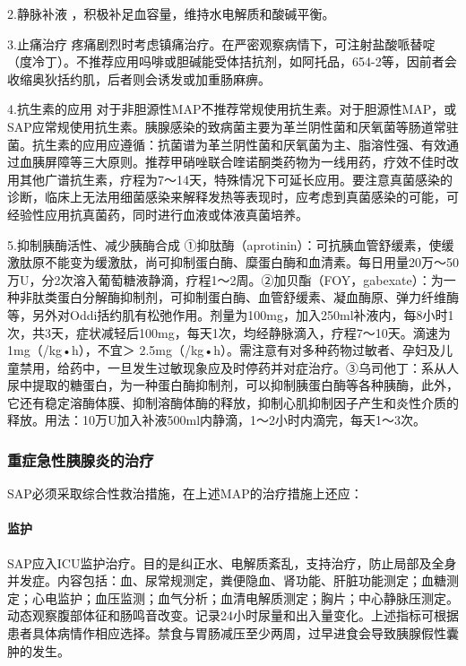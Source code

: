 2.静脉补液 ，积极补足血容量，维持水电解质和酸碱平衡。

3.止痛治疗
疼痛剧烈时考虑镇痛治疗。在严密观察病情下，可注射盐酸哌替啶（度冷丁）。不推荐应用吗啡或胆碱能受体拮抗剂，如阿托品，654-2等，因前者会收缩奥狄括约肌，后者则会诱发或加重肠麻痹。

4.抗生素的应用
对于非胆源性MAP不推荐常规使用抗生素。对于胆源性MAP，或SAP应常规使用抗生素。胰腺感染的致病菌主要为革兰阴性菌和厌氧菌等肠道常驻菌。抗生素的应用应遵循：抗菌谱为革兰阴性菌和厌氧菌为主、脂溶性强、有效通过血胰屏障等三大原则。推荐甲硝唑联合喹诺酮类药物为一线用药，疗效不佳时改用其他广谱抗生素，疗程为7～14天，特殊情况下可延长应用。要注意真菌感染的诊断，临床上无法用细菌感染来解释发热等表现时，应考虑到真菌感染的可能，可经验性应用抗真菌药，同时进行血液或体液真菌培养。

5.抑制胰酶活性、减少胰酶合成
①抑肽酶（aprotinin）：可抗胰血管舒缓素，使缓激肽原不能变为缓激肽，尚可抑制蛋白酶、糜蛋白酶和血清素。每日用量20万～50万U，分2次溶入葡萄糖液静滴，疗程1～2周。②加贝酯（FOY，gabexate）：为一种非肽类蛋白分解酶抑制剂，可抑制蛋白酶、血管舒缓素、凝血酶原、弹力纤维酶等，另外对Oddi括约肌有松弛作用。剂量为100mg，加入250ml补液内，每8小时1次，共3天，症状减轻后100mg，每天1次，均经静脉滴入，疗程7～10天。滴速为1mg（/kg•h），不宜＞
2.5mg（/kg•h）。需注意有对多种药物过敏者、孕妇及儿童禁用，给药中，一旦发生过敏现象应及时停药并对症治疗。③乌司他丁：系从人尿中提取的糖蛋白，为一种蛋白酶抑制剂，可以抑制胰蛋白酶等各种胰酶，此外，它还有稳定溶酶体膜、抑制溶酶体酶的释放，抑制心肌抑制因子产生和炎性介质的释放。用法：10万U加入补液500ml内静滴，1～2小时内滴完，每天1～3次。

\subsubsection{重症急性胰腺炎的治疗}

SAP必须采取综合性救治措施，在上述MAP的治疗措施上还应：

\paragraph{监护}

SAP应入ICU监护治疗。目的是纠正水、电解质紊乱，支持治疗，防止局部及全身并发症。内容包括：血、尿常规测定，粪便隐血、肾功能、肝脏功能测定；血糖测定；心电监护；血压监测；血气分析；血清电解质测定；胸片；中心静脉压测定。动态观察腹部体征和肠鸣音改变。记录24小时尿量和出入量变化。上述指标可根据患者具体病情作相应选择。禁食与胃肠减压至少两周，过早进食会导致胰腺假性囊肿的发生。

